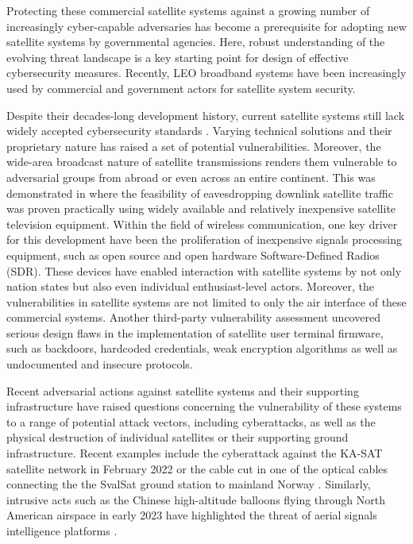 \documentclass[english, 12pt, a4paper, elec, utf8, a-1b, online]{aaltothesis}
\begin{document}
Protecting these commercial satellite systems against a growing number of increasingly cyber-capable adversaries has become a prerequisite for adopting new satellite systems by governmental agencies.
Here, robust understanding of the evolving threat landscape is a key starting point for design of effective cybersecurity measures.
Recently, LEO broadband systems have been increasingly used by commercial and government actors for satellite system security.

Despite their decades-long development history, current satellite systems still lack widely accepted cybersecurity standards \cite{lin2022defending}.
Varying technical solutions and their proprietary nature has raised a set of potential vulnerabilities.
Moreover, the wide-area broadcast nature of satellite transmissions renders them vulnerable to adversarial groups from abroad or even across an entire continent.
This was demonstrated in \cite{pavur2020tale} where the feasibility of eavesdropping downlink satellite traffic was proven practically using widely available and relatively inexpensive satellite television equipment.
Within the field of wireless communication, one key driver for this development have been the proliferation of inexpensive signals processing equipment, such as open source and open hardware Software-Defined Radios (SDR).
These devices have enabled interaction with satellite systems by not only nation states but also even individual enthusiast-level actors.
Moreover, the vulnerabilities in satellite systems are not limited to only the air interface of these commercial systems.
Another third-party vulnerability assessment \cite{santamarta2014wake} uncovered serious design flaws in the implementation of satellite user terminal firmware, such as backdoors, hardcoded credentials, weak encryption algorithms as well as undocumented and insecure protocols.

Recent adversarial actions against satellite systems and their supporting infrastructure have raised questions concerning the vulnerability of these systems to a range of potential attack vectors, including cyberattacks, as well as the physical destruction of individual satellites or their supporting ground infrastructure.
Recent examples include the cyberattack against the KA-SAT satellite network in February 2022 \cite{boschetti2022space} or the cable cut in one of the optical cables connecting the the SvalSat ground station to mainland Norway \cite{schia2023subsea}.
Similarly, intrusive acts such as the Chinese high-altitude balloons flying through North American airspace in early 2023 have highlighted the threat of aerial signals intelligence platforms \cite{wip}.
\end{document}

